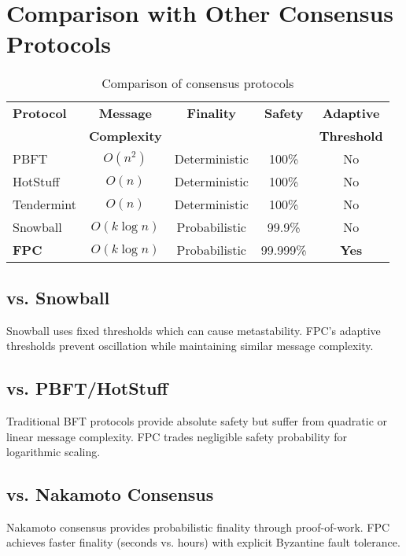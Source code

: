 \documentclass[11pt,a4paper]{article}
\begin{document}
\section{Comparison with Other Consensus Protocols}
\label{sec:comparison}

\begin{table}[h]
\centering
\begin{tabular}{lcccc}
\toprule
\textbf{Protocol} & \textbf{Message} & \textbf{Finality} & \textbf{Safety} & \textbf{Adaptive} \\
& \textbf{Complexity} & & & \textbf{Threshold} \\
\midrule
PBFT & $O(n^2)$ & Deterministic & 100\% & No \\
HotStuff & $O(n)$ & Deterministic & 100\% & No \\
Tendermint & $O(n)$ & Deterministic & 100\% & No \\
Snowball & $O(k \log n)$ & Probabilistic & 99.9\% & No \\
\textbf{FPC} & $O(k \log n)$ & Probabilistic & 99.999\% & \textbf{Yes} \\
\bottomrule
\end{tabular}
\caption{Comparison of consensus protocols}
\label{tab:comparison}
\end{table}

\subsection{vs. Snowball}

Snowball uses fixed thresholds which can cause metastability. FPC's adaptive thresholds prevent oscillation while maintaining similar message complexity.

\subsection{vs. PBFT/HotStuff}

Traditional BFT protocols provide absolute safety but suffer from quadratic or linear message complexity. FPC trades negligible safety probability for logarithmic scaling.

\subsection{vs. Nakamoto Consensus}

Nakamoto consensus provides probabilistic finality through proof-of-work. FPC achieves faster finality (seconds vs. hours) with explicit Byzantine fault tolerance.
\end{document}
